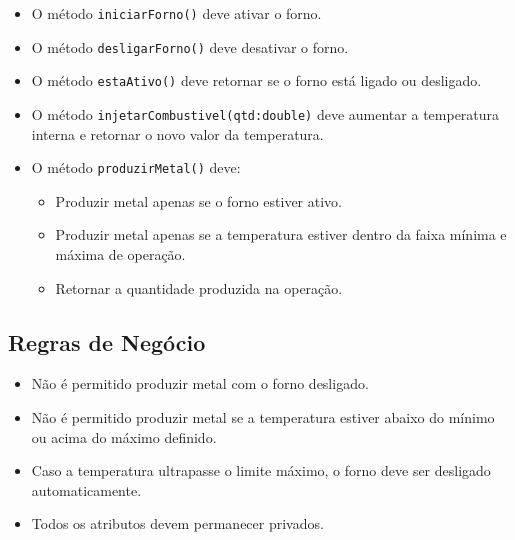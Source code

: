 \documentclass[12pt]{article}
\begin{document}
\begin{itemize}
    \item O método \texttt{iniciarForno()} deve ativar o forno.
    \item O método \texttt{desligarForno()} deve desativar o forno.
    \item O método \texttt{estaAtivo()} deve retornar se o forno está ligado ou desligado.
    \item O método \texttt{injetarCombustivel(qtd:double)} deve aumentar a temperatura interna e retornar o novo valor da temperatura.
    \item O método \texttt{produzirMetal()} deve:
    \begin{itemize}
        \item Produzir metal apenas se o forno estiver ativo.
        \item Produzir metal apenas se a temperatura estiver dentro da faixa mínima e máxima de operação.
        \item Retornar a quantidade produzida na operação.
    \end{itemize}
\end{itemize}

\subsection*{Regras de Negócio}

\begin{itemize}
    \item Não é permitido produzir metal com o forno desligado.
    \item Não é permitido produzir metal se a temperatura estiver abaixo do mínimo ou acima do máximo definido.
    \item Caso a temperatura ultrapasse o limite máximo, o forno deve ser desligado automaticamente.
    \item Todos os atributos devem permanecer privados.
\end{itemize}


\end{document}

